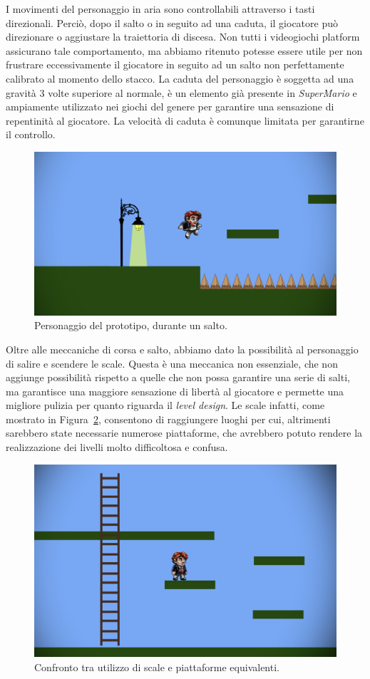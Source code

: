 I movimenti del personaggio in aria sono controllabili attraverso i tasti direzionali. Perciò, dopo il salto o in seguito ad una caduta, il giocatore può direzionare o aggiustare la traiettoria di discesa. Non tutti i videogiochi platform assicurano tale comportamento, ma abbiamo ritenuto potesse essere utile per non frustrare eccessivamente il giocatore in seguito ad un salto non perfettamente calibrato al momento dello stacco.
La caduta del personaggio è soggetta ad una gravità 3 volte superiore al normale, è un elemento già presente in \textit{SuperMario} e ampiamente utilizzato nei giochi del genere per garantire una sensazione di repentinità al giocatore. La velocità di caduta è comunque limitata per garantirne il controllo.

\begin{figure}%
	\centering
	\includegraphics[width= 0.8\columnwidth]{images/gameDesign/05.jpg}
	\caption{Personaggio del prototipo, durante un salto.}
	\label{fig:platform_salto}
\end{figure}

Oltre alle meccaniche di corsa e salto, abbiamo dato la possibilità al personaggio di salire e scendere le scale. Questa è una meccanica non essenziale, che non aggiunge possibilità rispetto a quelle che non possa garantire una serie di salti, ma garantisce una maggiore sensazione di libertà al giocatore e permette una migliore pulizia per quanto riguarda il \textit{level design}. Le scale infatti, come mostrato in Figura~\ref{fig:platform_scala_piattaforme}, consentono di raggiungere luoghi per cui, altrimenti sarebbero state necessarie numerose piattaforme, che avrebbero potuto rendere la realizzazione dei livelli molto difficoltosa e confusa.

\begin{figure}%
	\centering
	\includegraphics[width= 0.8\columnwidth]{images/gameDesign/06.jpg}
	\caption{Confronto tra utilizzo di scale e piattaforme equivalenti.}
	\label{fig:platform_scala_piattaforme}
\end{figure}

